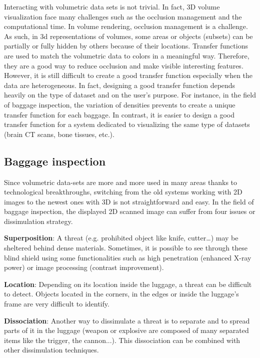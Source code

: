   Interacting with volumetric data sets is not trivial. In fact, 3D volume visualization face many challenges such as the occlusion management and the computational time.
 In volume rendering, occlusion management is a challenge. As such, in 3d representations of volumes, some areas or objects (subsets) can be partially or fully hidden by others because of their locations. Transfer functions are used to match the volumetric data to colors in a meaningful way. Therefore, they are a good way to reduce occlusion and make visible interesting features.  However, it is still difficult to create a good transfer function especially when the data are heterogeneous. In fact, designing a good transfer function depends heavily on the type of dataset and on the user's purpose. For instance, in the field of baggage inspection, the variation of densities prevents to create a unique transfer function for each baggage. In contrast, it is easier to design a good transfer function for a system dedicated to visualizing the same type of datasets (brain CT scans, bone tissues, etc.). 
 
 \subsection{Baggage inspection}
 
  Since volumetric data-sets are more and more used in many areas thanks to technological breakthroughs, switching from the old systems working with 2D images to the newest ones with 3D is not straightforward and easy.  In the field of baggage inspection, the displayed 2D scanned image can suffer from four issues or dissimulation strategy.

\textbf{Superposition}: A threat (e.g. prohibited object like knife, cutter…) may be sheltered behind dense materials. Sometimes, it is possible to see through these blind shield using some functionalities such as high penetration (enhanced X-ray power) or image processing (contrast improvement). 

\textbf{Location}: Depending on its location inside the luggage, a threat can be difficult to detect. Objects located in the corners, in the edges or inside the luggage's frame are very difficult to identify.

\textbf{Dissociation}: Another way to dissimulate a threat is to separate and to spread parts of it in the luggage (weapon or explosive are composed of many separated items like the trigger, the cannon...). This dissociation can be combined with other dissimulation techniques.

